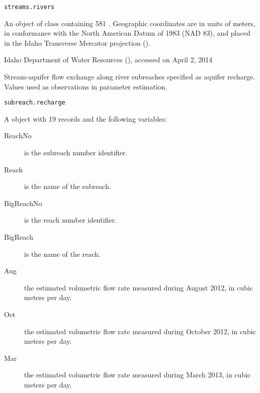 \documentclass[letterpaper]{book}
\begin{document}
%
\begin{Usage}
\begin{verbatim}
streams.rivers
\end{verbatim}
\end{Usage}
%
\begin{Format}
An object of  class containing 581 .
Geographic coordinates are in units of meters, in conformance with the North American Datum of 1983 (NAD 83), and placed in the
Idaho Transverse Mercator projection ().
\end{Format}
%
\begin{Source}\relax
Idaho Department of Water Resources (), accessed on April 2, 2014
\end{Source}
%
\begin{Examples}
\end{Examples}
%
\begin{Description}\relax
Stream-aquifer flow exchange along river subreaches specified as aquifer recharge.
Values used as observations in parameter estimation.
\end{Description}
%
\begin{Usage}
\begin{verbatim}
subreach.recharge
\end{verbatim}
\end{Usage}
%
\begin{Format}
A  object with 19 records and the following variables:
\begin{description}

\item[ReachNo] is the subreach number identifier.
\item[Reach] is the name of the subreach.
\item[BigReachNo] is the reach number identifier.
\item[BigReach] is the name of the reach.
\item[Aug] the estimated volumetric flow rate measured during August 2012, in cubic meters per day.
\item[Oct] the estimated volumetric flow rate measured during October 2012, in cubic meters per day.
\item[Mar] the estimated volumetric flow rate measured during March 2013, in cubic meters per day.

\end{description}

\end{Format}
\end{document}
